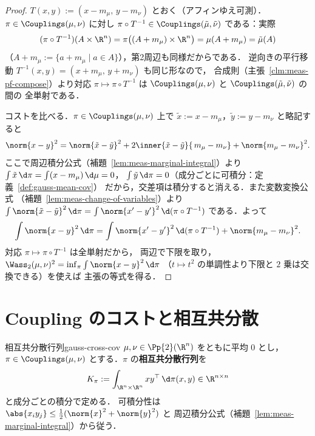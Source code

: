 \begin{proof}
  $T(x,y):=(x-m_\mu,\,y-m_\nu)$ とおく（アフィンゆえ可測）．
  $\pi\in\Couplings(\mu,\nu)$ に対し
  $\pi\circ T^{-1}\in\Couplings(\tilde\mu,\tilde\nu)$ である：実際
  \[
    (\pi\circ T^{-1})(A\times\R^n)
    =\pi\bigl((A+m_\mu)\times\R^n\bigr)
    =\mu(A+m_\mu)
    =\tilde\mu(A)
  \]
  （$A+m_\mu:=\{a+m_\mu\mid a\in A\}$），第2周辺も同様だからである．
  逆向きの平行移動 $T^{-1}(x,y)=(x+m_\mu,\,y+m_\nu)$ も同じ形なので，
  合成則（主張~\ref{clm:meas-pf-compose}）より対応
  $\pi\mapsto \pi\circ T^{-1}$ は
  $\Couplings(\mu,\nu)$ と $\Couplings(\tilde\mu,\tilde\nu)$ の間の
  全単射である．

  コストを比べる．$\pi\in\Couplings(\mu,\nu)$ 上で
  $\tilde x:=x-m_\mu$，$\tilde y:=y-m_\nu$ と略記すると
  \[
    \norm{x-y}^2
    =\norm{\tilde x-\tilde y}^2
    +2\inner{\tilde x-\tilde y}{\,m_\mu-m_\nu}
    +\norm{m_\mu-m_\nu}^2.
  \]
  ここで周辺積分公式（補題~\ref{lem:meas-marginal-integral}）より
  $\int\tilde x\,\d\pi=\int(x-m_\mu)\,\d\mu=0$，
  $\int\tilde y\,\d\pi=0$（成分ごとに可積分：定義~\ref{def:gauss-mean-cov}）
  だから，交差項は積分すると消える．また変数変換公式
  （補題~\ref{lem:meas-change-of-variables}）より
  $\int\norm{\tilde x-\tilde y}^2\,\d\pi
  =\int\norm{x'-y'}^2\,\d(\pi\circ T^{-1})$ である．よって
  \[
    \int\norm{x-y}^2\,\d\pi
    =\int\norm{x'-y'}^2\,\d(\pi\circ T^{-1})
    +\norm{m_\mu-m_\nu}^2.
  \]
  対応 $\pi\mapsto \pi\circ T^{-1}$ は全単射だから，
  両辺で下限を取り，
  $\Wass_2(\mu,\nu)^2=\inf_\pi\int\norm{x-y}^2\,\d\pi$
  （$t\mapsto t^2$ の単調性より下限と $2$ 乗は交換できる）を使えば
  主張の等式を得る．
\end{proof}

\section{Coupling のコストと相互共分散}
\label{sec:gauss-cost}

\begin{definition}{相互共分散行列}{gauss-cross-cov}
  $\mu,\nu\in\Pp{2}(\R^n)$ をともに平均 $0$ とし，
  $\pi\in\Couplings(\mu,\nu)$ とする．$\pi$ の\textbf{相互共分散行列}を
  \[
    K_\pi:=\int_{\R^n\times\R^n}xy^\top\,\d\pi(x,y)\in\R^{n\times n}
  \]
  と成分ごとの積分で定める．
  可積分性は $\abs{x_iy_j}\leq\frac{1}{2}(\norm{x}^2+\norm{y}^2)$ と
  周辺積分公式（補題~\ref{lem:meas-marginal-integral}）から従う．
\end{definition}

